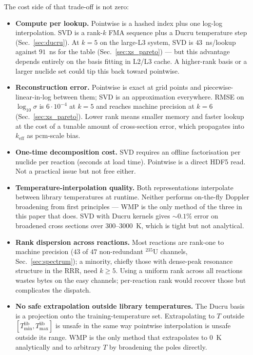 The cost side of that trade-off is not zero:

\begin{itemize}
\item \textbf{Compute per lookup.} Pointwise is a hashed
  index plus one log-log interpolation. SVD is a rank-$k$
  FMA sequence plus a Ducru temperature step
  (Sec.~\ref{sec:ducru}). At $k = 5$ on the large-L3 system, SVD is
  $43$~ns/lookup against $91$~ns for the table
  (Sec.~\ref{sec:xs_pareto}) --- but this advantage depends
  entirely on the basis fitting in L2/L3 cache. A
  higher-rank basis or a larger nuclide set could tip this
  back toward pointwise.
\item \textbf{Reconstruction error.} Pointwise is exact at
  grid points and piecewise-linear-in-log between them; SVD
  is an approximation everywhere. RMSE on $\log_{10}\sigma$
  is $6\cdot 10^{-4}$ at $k = 5$ and reaches machine
  precision at $k = 6$ (Sec.~\ref{sec:xs_pareto}). Lower
  rank means smaller memory and faster lookup at the cost
  of a tunable amount of cross-section error, which
  propagates into $k_\text{eff}$ as pcm-scale bias.
\item \textbf{One-time decomposition cost.} SVD requires an
  offline factorisation per nuclide per reaction (seconds at
  load time). Pointwise is a direct HDF5 read. Not a
  practical issue but not free either.
\item \textbf{Temperature-interpolation quality.} Both
  representations interpolate between library temperatures
  at runtime. Neither performs on-the-fly Doppler
  broadening from first principles --- WMP is the only
  method of the three in this paper that does. SVD with
  Ducru kernels gives $\sim\!0.1\%$ error on broadened
  cross sections over $300$--$3000$~K, which is tight but
  not analytical.
\item \textbf{Rank dispersion across reactions.} Most
  reactions are rank-one to machine precision ($43$ of
  $47$ non-redundant $^{235}$U channels,
  Sec.~\ref{sec:spectrum}); a minority, chiefly those with
  dense-peak resonance structure in the RRR, need $k \geq
  5$. Using a uniform rank across all reactions wastes
  bytes on the easy channels; per-reaction rank would
  recover those but complicates the dispatch.
\item \textbf{No safe extrapolation outside library
  temperatures.} The Ducru basis is a projection onto the
  training-temperature set. Extrapolating to $T$ outside
  $[T_\text{min}^\text{lib}, T_\text{max}^\text{lib}]$ is
  unsafe in the same way pointwise interpolation is
  unsafe outside its range. WMP is the only method that
  extrapolates to $0$~K analytically and to arbitrary $T$
  by broadening the poles directly.
\end{itemize}

